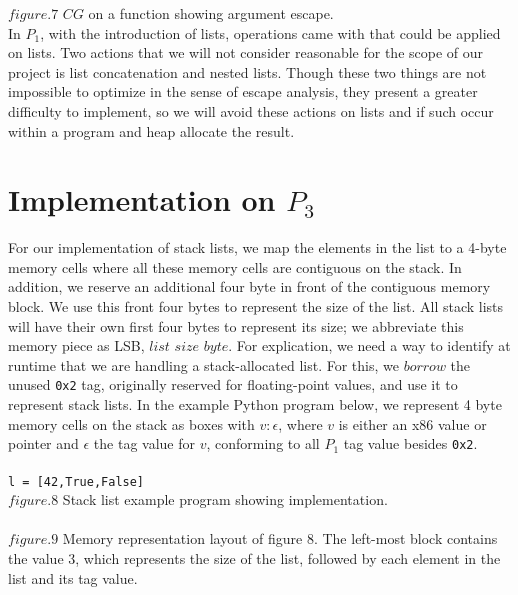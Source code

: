 \documentclass[11pt,article]{amsart}
\theoremstyle{definition}
\numberwithin{equation}{subsection}
\begin{document}
\begin{multicols}{2}
$figure.7$ $CG$ on a function showing argument escape.\\ 

In $P_1$, with the introduction of lists, operations came with that could be applied on lists. Two actions that we will not consider reasonable for the scope of our project is list concatenation and nested lists.  Though these two things are not impossible to optimize in the sense of escape analysis, they present a greater difficulty to implement, so we will avoid these actions on lists and if such occur within a program and heap allocate the result.

\section{Implementation on $P_3$}
For our implementation of stack lists, we map the elements in the list to a 4-byte memory cells where all these memory cells are contiguous on the stack. In addition, we reserve an additional four byte in front of the contiguous memory block. We use this front four bytes to represent the size of the list. All stack lists will have their own first four bytes to represent its size; we abbreviate this memory piece as LSB, $list$ $size$ $byte$. For explication, we need a way to identify at runtime that we are handling a stack-allocated list. For this, we $borrow$ the unused \texttt{0x2} tag, originally reserved for floating-point values, and use it to represent stack lists. In the example Python program below, we represent 4 byte memory cells on the stack as boxes with $v:\epsilon$, where $v$ is either an x86 value or pointer and $\epsilon$ the tag value for $v$, conforming to all $P_1$ tag value besides \texttt{0x2}. \\ \\
\texttt{l = [42,True,False]} \\
$figure.8$ Stack list example program showing implementation.\\ \\
$figure.9$ Memory representation layout of figure 8. The left-most block contains the value 3, which represents the size of the list, followed by each element in the list and its tag value. 


\end{multicols}
\end{document}
